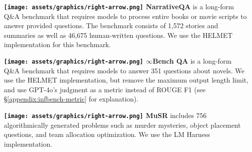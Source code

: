 \vspace{2pt}
\noindent \textbf{\texttt{[image: assets/graphics/right-arrow.png]} NarrativeQA} \cite{kocisky_narrativeqa_2018} is a long-form Q\&A benchmark that requires models to process entire books or movie scripts to answer provided questions. The benchmark consists of 1,572 stories and summaries as well as 46,675 human-written questions. We use the HELMET implementation \cite{yen2024helmet} for this benchmark.

\vspace{2pt}
\noindent \textbf{\texttt{[image: assets/graphics/right-arrow.png]} $\infty$Bench QA} \cite{zhang2024inftybenchextendinglongcontext} is a long-form Q\&A benchmark that requires models to answer 351 questions about novels. We use the HELMET implementation, but remove the maximum output length limit, and use GPT-4o's judgment as a metric instead of ROUGE F1 (see \S\ref{appendix:infbench-metric} for explanation).

\vspace{2pt}
\noindent \textbf{\texttt{[image: assets/graphics/right-arrow.png]} MuSR} \cite{sprague_musr_2024} includes 756 algorithmically generated problems such as murder mysteries, object placement questions, and team allocation optimization. We use the LM Harness~\cite{eval-harness} implementation.

